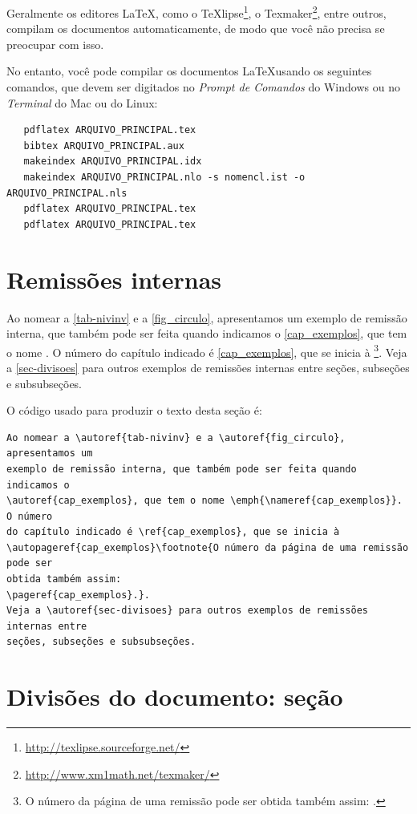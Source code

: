 Geralmente os editores \LaTeX, como o
TeXlipse\footnote{\url{http://texlipse.sourceforge.net/}}, o
Texmaker\footnote{\url{http://www.xm1math.net/texmaker/}}, entre outros,
compilam os documentos automaticamente, de modo que você não precisa se
preocupar com isso.

No entanto, você pode compilar os documentos \LaTeX usando os seguintes
comandos, que devem ser digitados no \emph{Prompt de Comandos} do Windows ou no
\emph{Terminal} do Mac ou do Linux:

\begin{verbatim}
   pdflatex ARQUIVO_PRINCIPAL.tex
   bibtex ARQUIVO_PRINCIPAL.aux
   makeindex ARQUIVO_PRINCIPAL.idx 
   makeindex ARQUIVO_PRINCIPAL.nlo -s nomencl.ist -o ARQUIVO_PRINCIPAL.nls
   pdflatex ARQUIVO_PRINCIPAL.tex
   pdflatex ARQUIVO_PRINCIPAL.tex
\end{verbatim}

\section{Remissões internas}

Ao nomear a \autoref{tab-nivinv} e a \autoref{fig_circulo}, apresentamos um
exemplo de remissão interna, que também pode ser feita quando indicamos o
\autoref{cap_exemplos}, que tem o nome \emph{}. O número
do capítulo indicado é \ref{cap_exemplos}, que se inicia à
\footnote{O número da página de uma remissão pode ser
obtida também assim:
\pageref{cap_exemplos}.}.
Veja a \autoref{sec-divisoes} para outros exemplos de remissões internas entre
seções, subseções e subsubseções.

O código usado para produzir o texto desta seção é:

\begin{verbatim}
Ao nomear a \autoref{tab-nivinv} e a \autoref{fig_circulo}, apresentamos um
exemplo de remissão interna, que também pode ser feita quando indicamos o
\autoref{cap_exemplos}, que tem o nome \emph{\nameref{cap_exemplos}}. O número
do capítulo indicado é \ref{cap_exemplos}, que se inicia à
\autopageref{cap_exemplos}\footnote{O número da página de uma remissão pode ser
obtida também assim:
\pageref{cap_exemplos}.}.
Veja a \autoref{sec-divisoes} para outros exemplos de remissões internas entre
seções, subseções e subsubseções.
\end{verbatim}

\section{Divisões do documento: seção}\label{sec-divisoes}

